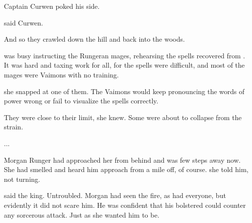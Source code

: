 Captain Curwen poked his side. 

said Curwen.

And so they crawled down the hill and back into the woods. 








\begin{comment}
\subsection{\Takestsha{} notices \vertex{}}
\end{comment}
\new
% 
\Takestsha{} was busy instructing the Rungeran mages, rehearsing the spells recovered from \EreshKal. 
It was hard and taxing work for all, for the \EreshKali{} spells were difficult, and most of the mages were Vaimons with no \rethyactic{} training. 

she snapped at one of them. 
The Vaimons would keep pronouncing the words of power wrong or fail to visualize the spells correctly. 

They were close to their limit, she knew. 
Some were about to collapse from the strain. 

...

Morgan Runger had approached her from behind and was few steps away now. 
She had smelled and heard him approach from a mile off, of course. 
 she told him, not turning. 

 said the king. 
Untroubled. 
Morgan had seen the fire, as had everyone, but evidently it did not scare him. 
He was confident that his bolstered \ishrah{} could counter any sorcerous attack. 
Just as she wanted him to be. 

